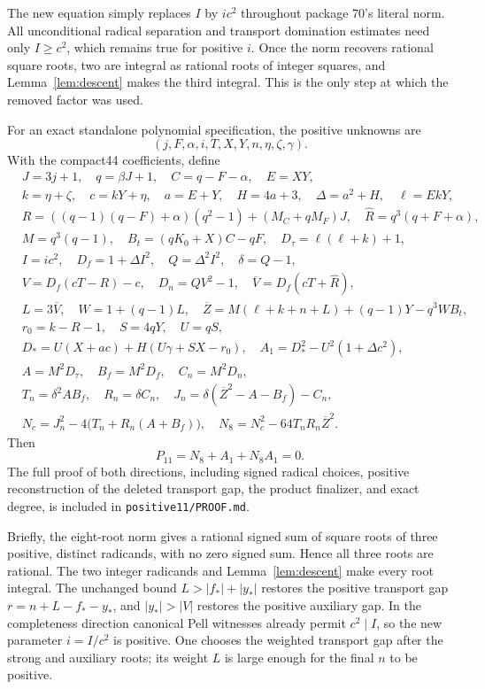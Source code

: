 \documentclass[11pt]{article}
\begin{document}
The new equation simply replaces $I$ by $ic^2$ throughout package 70's
literal norm. All unconditional radical separation and transport domination
estimates need only $I\ge c^2$, which remains true for positive $i$.
Once the norm recovers rational square roots, two are integral as rational
roots of integer squares, and Lemma~\ref{lem:descent} makes the third
integral. This is the only step at which the removed factor was used.

For an exact standalone polynomial specification, the positive unknowns are
\[
 (j,F,\alpha,i,T,X,Y,n,\eta,\zeta,\gamma).
\]
With the compact44 coefficients, define
\begin{align*}
 &J=3j+1,\quad q=\beta J+1,\quad C=q-F-\alpha,\quad E=XY,\\
 &k=\eta+\zeta,\quad c=kY+\eta,\quad a=E+Y,\quad H=4a+3,\quad
 \Delta=a^2+H,\quad\ell=EkY,\\
 &R=((q-1)(q-F)+\alpha)(q^2-1)+(M_C+qM_F)J,\quad
 \widehat R=q^3(q+F+\alpha),\\
 &M=q^3(q-1),\quad B_t=(qK_0+X)C-qF,\quad D_\tau=\ell(\ell+k)+1,\\
 &I=ic^2,\quad D_f=1+\Delta I^2,\quad Q=\Delta^2I^2,\quad\delta=Q-1,\\
 &V=D_f(cT-R)-c,\quad D_n=QV^2-1,\quad\overline V=D_f(cT+\widehat R),\\
 &L=3\overline V,\quad W=1+(q-1)L,\quad
 \overline Z=M(\ell+k+n+L)+(q-1)Y-q^3WB_t,\\
 &r_0=k-R-1,\quad S=4qY,\quad U=qS,\\
 &D_*=U(X+ac)+H(U\gamma+SX-r_0),\quad
 A_1=D_*^2-U^2(1+\Delta c^2),\\
 &A=M^2D_\tau,\quad B_f=M^2D_f,\quad C_n=M^2D_n,\\
 &T_n=\delta^2AB_f,\quad R_n=\delta C_n,\quad
 J_n=\delta(\overline Z^2-A-B_f)-C_n,\\
 &N_c=J_n^2-4\bigl(T_n+R_n(A+B_f)\bigr),\quad
 N_8=N_c^2-64T_nR_n\overline Z^2.
\end{align*}
Then
\begin{equation}\boxed{\quad P_{11}=N_8+A_1+N_8A_1=0.\quad}\label{eq:positive11}\end{equation}
The full proof of both directions, including signed radical choices,
positive reconstruction of the deleted transport gap, the product finalizer,
and exact degree, is included in \texttt{positive11/PROOF.md}.

Briefly, the eight-root norm gives a rational signed sum of square roots of three positive,
distinct radicands, with no zero signed sum. Hence all three roots are
rational. The two integer radicands and Lemma~\ref{lem:descent} make every
root integral. The unchanged bound $L>|f_*|+|y_*|$ restores the positive
transport gap $r=n+L-f_*-y_*$, and $|y_*|>|V|$ restores the positive
auxiliary gap. In the completeness direction canonical Pell witnesses
already permit $c^2\mid I$, so the new parameter $i=I/c^2$ is positive.
One chooses the weighted transport gap after the strong and auxiliary
roots; its weight $L$ is large enough for the final $n$ to be positive.
\end{document}
